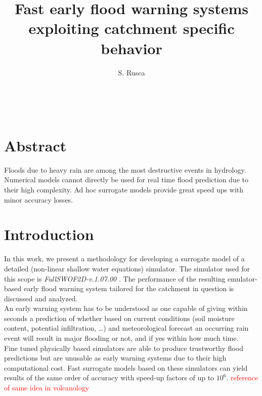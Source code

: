 \documentclass[12pt,a4paper,twocolumn,fleqn]{narms}
\begin{document}
\title{Fast early flood warning systems exploiting catchment specific behavior}
\author{{S. Rusca} \\
{} \\\\
{}\\
{}
} \maketitle


\section*{Abstract}

Floods due to heavy rain are among the most destructive events in hydrology. 
Numerical models cannot directly be used for real time flood prediction due to
their high complexity. Ad hoc surrogate models provide great speed
ups with minor accuracy losses.


\section{Introduction}

In this work, we present a methodology for developing a surrogate model of
a detailed (non-linear shallow water equations) simulator. The simulator used
for this scope is \textit{FullSWOF\textunderscore2D-v.1.07.00}
\cite{noauthor_fullswof_nodate}. The performance of the resulting emulator-based
early flood warning system tailored for the catchment in question is discussed
and analyzed.\\

An early warning system has to be understood as one capable of giving within
seconds a prediction of whether based on current conditions (soil moisture content,
potential infiltration, \dots) and meteorological forecast an occurring rain
event will result in major flooding or not, and if yes within how much time.\\

Fine tuned physically based simulators are able
to produce trustworthy flood predictions but are unusable as early warning
systems due to their high computational cost.
Fast surrogate models based on these simulators can yield results of the same
order of accuracy with speed-up factors of up to $10^6$.
\textcolor{red}{reference of same idea in volcanology}
\end{document}
